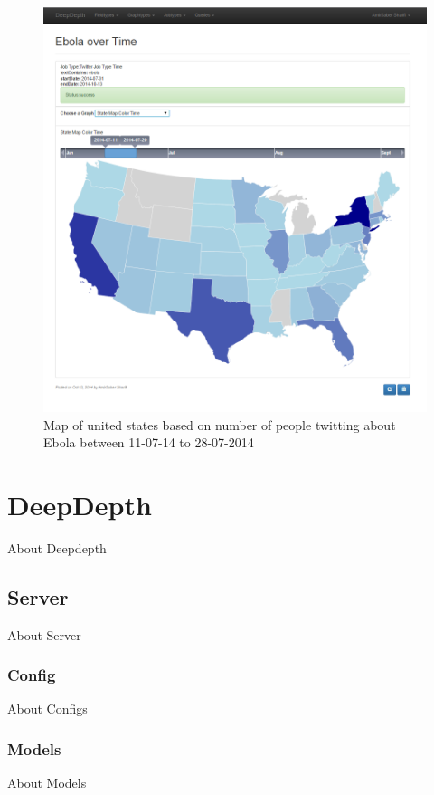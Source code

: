 \documentclass[a4paper,11pt]{report}
\begin{document}
\begin{figure}[!hbp]
\begin{center}
\includegraphics[scale=0.5]{map.png}
\end{center}
\caption{Map of united states based on number of people twitting about Ebola between 11-07-14 to 28-07-2014}
\label{fig:d3usanewmexico}
\end{figure}

\chapter{DeepDepth}
About Deepdepth

\section{Server}
About Server

\subsection{Config}
About Configs

\subsection{Models}
About Models
\end{document}
